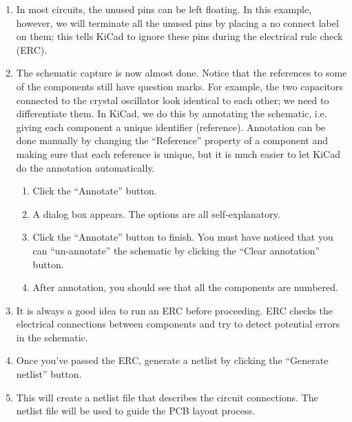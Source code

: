 \documentclass[12pt,letterpaper]{scrartcl}
\begin{document}
\begin{enumerate}
	\item In most circuits, the unused pins can be left floating. In this example, however, we will terminate all the unused pins by placing a no connect label on them; this tells KiCad to ignore these pins during the electrical rule check (ERC).
	
	\item The schematic capture is now almost done. Notice that the references to some of the components still have question marks. For example, the two capacitors connected to the crystal oscillator look identical to each other; we need to differentiate them. In KiCad, we do this by annotating the schematic, i.e. giving each component a unique identifier (reference). Annotation can be done manually by changing the ``Reference'' property of a component and making sure that each reference is unique, but it is much easier to let KiCad do the annotation automatically. 
		\begin{enumerate}
			\item Click the ``Annotate'' button. 
			\item A dialog box appears. The options are all self-explanatory. 
		
			\item Click the ``Annotate'' button to finish. You must have noticed that you can ``un-annotate'' the schematic by clicking the ``Clear annotation'' button. 
			
			\item After annotation, you should see that all the components are numbered. 
		\end{enumerate}
		
	\item It is always a good idea to run an ERC before proceeding. ERC checks the electrical connections between components and try to detect potential errors in the schematic.
	
	\item Once you’ve passed the ERC, generate a netlist by clicking the ``Generate netlist'' button.
	
	\item This will create a netlist file that describes the circuit connections. The netlist file will be used to guide the PCB layout process.
	

\end{enumerate}
\end{document}
